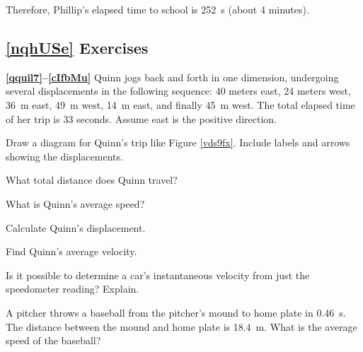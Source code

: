 \documentclass[main.tex]{subfiles}
\begin{document}
Therefore, Phillip's elapsed time to school is \SI{252}{s} (about 4 minutes).

\solutionEnd

\vspace{1em}

\cyanhrule


\subsection*{\ref{nqhUSe} Exercises}

\textbf{\ref{qquil7}--\ref{cIfbMu}} Quinn jogs back and forth in one dimension, undergoing several displacements in the following sequence: 40 meters east, 24 meters west, \SI{36}{m} east, \SI{49}{m} west, \SI{14}{m} east, and finally \SI{45}{m} west. The total elapsed time of her trip is 33 seconds. Assume east is the positive direction.

\begin{exercise} \label{qquil7}
    Draw a diagram for Quinn's trip like Figure \ref{vds9fx}. Include labels and arrows showing the displacements.
\end{exercise}

\begin{exercise} \label{c7YaTG}
    What total distance does Quinn travel?
\end{exercise}

\begin{exercise} \label{ASXgWQ}
    What is Quinn's average speed?
\end{exercise}

\begin{exercise} \label{iG7rDo}
    Calculate Quinn's displacement.
\end{exercise}

\begin{exercise} \label{cIfbMu}
    Find Quinn's average velocity.
\end{exercise}

\cyanhrule

\begin{exercise} \label{JYqHaE}
    Is it possible to determine a car's instantaneous velocity from just the speedometer reading? Explain.
\end{exercise}

\begin{exercise} \label{EeYgx7}
A pitcher throws a baseball from the pitcher's mound to home plate in \SI{0.46}{s}. The distance between the mound and home plate is \SI{18.4}{m}. What is the average speed of the baseball?
\end{exercise}
\end{document}
